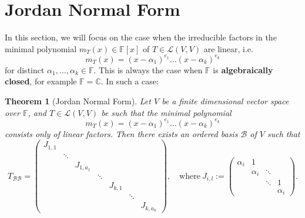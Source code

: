 \documentclass[11pt,openany]{book}
\theoremstyle{plain}
\newtheorem{theorem}{Theorem}[chapter]
\theoremstyle{definition}
\theoremstyle{remark}
\begin{document}
\section{Jordan Normal Form}
In this section, we will focus on the case when the irreducible factors in the minimal polynomial $m_T(x) \in \mathbb{F}[x]$ of 
$T \in \mathcal{L}(V,V)$ are linear, i.e.
$$m_T(x) = (x-\alpha_1)^{e_1} \dots (x - \alpha_k)^{e_k}$$
for distinct $\alpha_1, \dots, \alpha_k \in \mathbb{F}$.
This is always the case when $\mathbb{F}$ is {\bf algebraically closed}, for example $\mathbb{F} = \mathbb{C}$. In such a case:
\begin{theorem}[Jordan Normal Form]
Let $V$ be a finite dimensional vector space over $\mathbb{F}$, and $T \in \mathcal{L}(V,V)$ be such that the minimal polynomial
$$m_T(x) = (x-\alpha_1)^{e_1} \dots (x - \alpha_k)^{e_k}$$
consists only of linear factors. Then there exists an ordered basis $\mathcal{B}$ of $V$ such that 
    $$T_{\mathcal{B}\mathcal{B}} = \begin{pmatrix} J_{1,1} & & & & & \\
& \ddots & & & & & \\ 
& & J_{1,a_1} & & & & \\
& & & \ddots & & &\\
& & & & J_{k,1} & & \\
& & & & & \ddots & \\
& & & & & & J_{k,a_k}\end{pmatrix}, \quad \text{where}\ J_{i,l} := \begin{pmatrix} \alpha_i & 1 & & \\
 & \alpha_i & \ddots & \\
 &  & \ddots & 1 \\
 &  &  & \alpha_i \end{pmatrix}.
$$
\end{theorem}
\end{document}
